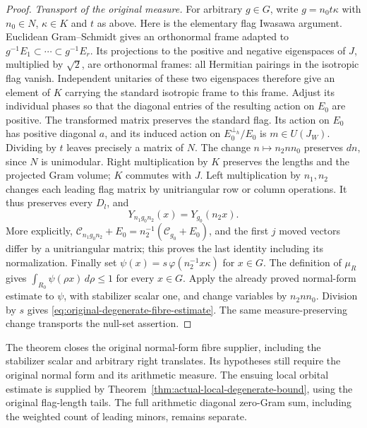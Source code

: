 \begin{proof}
\emph{Transport of the original measure.}
For arbitrary $g\in G$, write
$g=n_0t\kappa$ with $n_0\in N$, $\kappa\in K$ and $t$
as above.  Here is the elementary flag Iwasawa argument.
Euclidean Gram--Schmidt gives an orthonormal frame adapted to
$g^{-1}E_1\subset\cdots\subset g^{-1}E_r$.  Its projections
to the positive and negative eigenspaces of $J$, multiplied by
$\sqrt2$, are orthonormal frames: all Hermitian pairings in
the isotropic flag vanish.  Independent unitaries of these
two eigenspaces therefore give an element of $K$ carrying
the standard isotropic frame to this frame.  Adjust its
individual phases so that the diagonal entries of the
resulting action on $E_0$ are positive.  The transformed
matrix preserves the standard flag.  Its action on $E_0$
has positive diagonal $a$, and its induced action on
$E_0^{\perp_h}/E_0$ is $m\in U(J_W)$.  Dividing by $t$
leaves precisely a matrix of $N$.
The change $n\mapsto n_2nn_0$ preserves $dn$, since $N$
is unimodular.  Right multiplication by $K$ preserves the
lengths and the projected Gram volume; $K$ commutes with $J$.
Left multiplication by $n_1,n_2$ changes each leading flag
matrix by unitriangular row or column operations.  It thus
preserves every $D_l$, and
\[
       Y_{n_1g_0n_2}(x)=Y_{g_0}(n_2x).
\]
More explicitly,
$\mathcal C_{n_1g_0n_2}+E_0=n_2^{-1}(\mathcal C_{g_0}+E_0)$,
and the first $j$ moved vectors differ by a unitriangular
matrix; this proves the last identity including its
normalization.
Finally set
$\psi(x)=s\,\varphi(n_2^{-1}x\kappa)$ for $x\in G$.
The definition of $\mu_R$ gives
$\int_{R_0}\psi(\rho x)\,d\rho\le1$ for every $x\in G$.
Apply the already proved normal-form estimate to $\psi$, with
stabilizer scalar one, and
change variables by $n_2nn_0$.  Division by $s$ gives
\eqref{eq:original-degenerate-fibre-estimate}.  The same
measure-preserving change transports the null-set assertion.
\end{proof}

The theorem closes the original normal-form fibre supplier,
including the stabilizer scalar and arbitrary right translates.
Its hypotheses still require the original normal form and its
arithmetic measure.  The ensuing local orbital estimate is supplied by
Theorem~\ref{thm:actual-local-degenerate-bound}, using the original
flag-length tails.  The full arithmetic diagonal zero-Gram sum,
including the weighted count of leading minors, remains separate.
